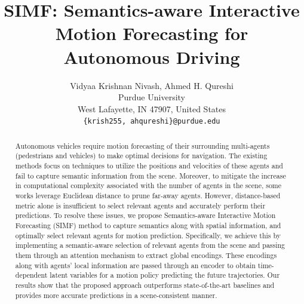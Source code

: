 \documentclass{article}
\title{SIMF: Semantics-aware Interactive Motion Forecasting for Autonomous Driving}
\author{
  Vidyaa Krishnan Nivash, Ahmed H. Qureshi\\
Purdue University\\ 
  West Lafayette, IN 47907, United States\\
  \texttt{\{krish255, ahqureshi\}@purdue.edu} \\
}
\begin{document}
\maketitle

\vspace{-10pt}
\begin{abstract}
Autonomous vehicles require motion forecasting of their surrounding multi-agents (pedestrians and vehicles) to make optimal decisions for navigation. The existing methods focus on techniques to utilize the positions and velocities of these agents and fail to capture semantic information from the scene. Moreover, to mitigate the increase in computational complexity associated with the number of agents in the scene, some works leverage Euclidean distance to prune far-away agents. However, distance-based metric alone is insufficient to select relevant agents and accurately perform their predictions. To resolve these issues, we propose Semantics-aware Interactive Motion Forecasting (SIMF) method to capture semantics along with spatial information, and optimally select relevant agents for motion prediction. Specifically, we achieve this by implementing a semantic-aware selection of relevant agents from the scene and passing them through an attention mechanism to extract global encodings. These encodings along with agents' local information are passed through an encoder to obtain time-dependent latent variables for a motion policy predicting the future trajectories.  Our results show that the proposed approach outperforms state-of-the-art baselines and provides more accurate predictions in a scene-consistent manner. 
\end{abstract}
\end{document}
